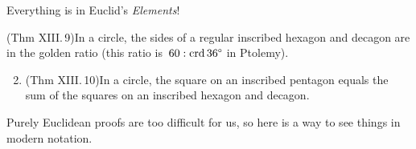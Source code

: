 \goodbreak




Everything is in Euclid's \emph{Elements}!

\begin{thm*}{}{}
	\exstart (Thm XIII.\,9)\lstsp In a circle, the sides of a regular inscribed hexagon and decagon are in the golden ratio (this ratio is\ $60:\crd \ang{36}$ in Ptolemy).
	\begin{enumerate}\setcounter{enumi}{1}
	  \item (Thm XIII.\,10)\lstsp In a circle, the square on an inscribed pentagon equals the sum of the squares on an inscribed hexagon and decagon.
	\end{enumerate}
\end{thm*}

Purely Euclidean proofs are too difficult for us, so here is a way to see things in modern notation.

